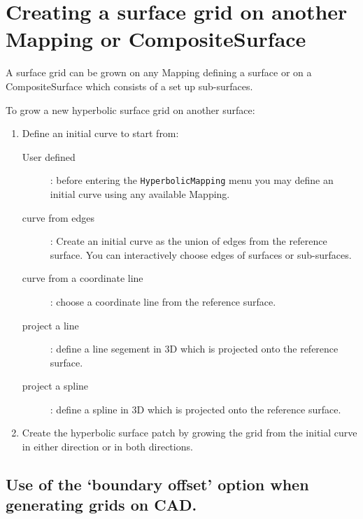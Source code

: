\section{Creating a surface grid on another Mapping or CompositeSurface}


A surface grid can be grown on any Mapping defining a surface or on a CompositeSurface which
consists of a set up sub-surfaces. 

To grow a new hyperbolic surface grid on another surface:

\begin{enumerate}
  \item Define an initial curve to start from:
    \begin{description}
      \item[User defined] : before entering the {\tt HyperbolicMapping} menu 
              you may define an initial curve using any available Mapping.
      \item[curve from edges] : Create an initial curve as the union of edges from the reference surface.
           You can interactively choose edges of surfaces or sub-surfaces.
      \item[curve from a coordinate line] : choose a coordinate line from the reference surface.
      \item[project a line] : define a line segement in 3D which is projected onto the reference surface.
      \item[project a spline] : define a spline in 3D which is projected onto the reference surface.
    \end{description}
  \item Create the hyperbolic surface patch by growing the grid from the initial curve in either direction
         or in both directions.
\end{enumerate}


\clearpage
\subsection{Use of the `boundary offset' option when generating grids on CAD.} \label{sec:boundaryOffset}

